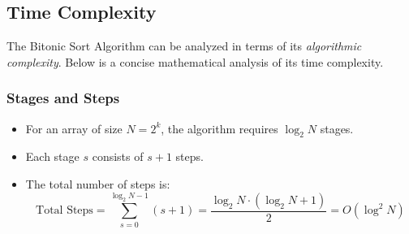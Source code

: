 \documentclass[12pt]{article}
\begin{document}



\subsection{Time Complexity}

The Bitonic Sort Algorithm can be analyzed in terms of its \textit{algorithmic complexity}. Below is a concise mathematical analysis of its time complexity.

\subsubsection{Stages and Steps}
\begin{itemize}[nosep]
    \item For an array of size \( N = 2^k \), the algorithm requires \( \log_2 N \) stages.
    \item Each stage \( s \) consists of \( s + 1 \) steps.
    \item The total number of steps is:
    \[
    \text{Total Steps} = \sum_{s=0}^{\log_2 N - 1} (s + 1) = \frac{\log_2 N \cdot (\log_2 N + 1)}{2} = O(\log^2 N)
    \]
\end{itemize}
\end{document}
